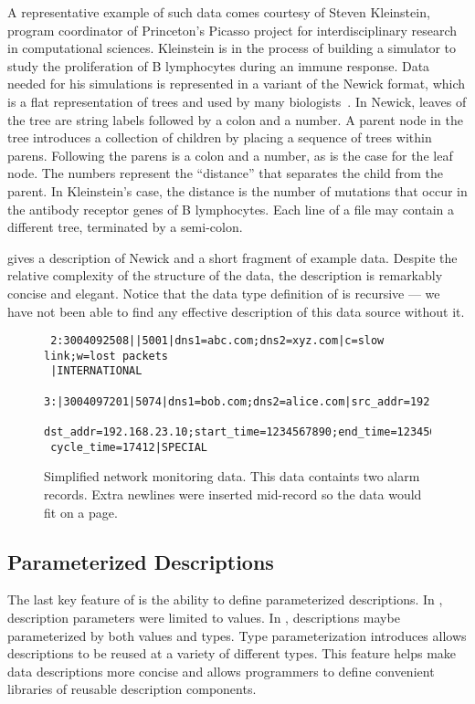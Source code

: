 A representative example of such data comes courtesy of Steven
Kleinstein, program coordinator of Princeton's Picasso project for
interdisciplinary research in computational sciences.  Kleinstein is
in the process of building a simulator to study the
proliferation of B lymphocytes during an immune response.  Data
needed for his simulations is represented in a variant of the
Newick format, which is a flat
representation of trees and used by 
many biologists~\cite{newick}.  In Newick, 
leaves of the tree are string labels followed by a colon and a number.
A parent node in the tree introduces a collection of children by
placing a sequence of trees within parens.  Following the parens is a
colon and a number, as is the case for the leaf node.
The numbers represent the ``distance'' 
that separates the child from the parent.  In
Kleinstein's case, the distance is the number of mutations that occur
in the antibody receptor genes of B lymphocytes.   Each line
of a file may contain a different tree, terminated by a semi-colon.

 gives a description of Newick and a short fragment 
of example data.  Despite the relative complexity of the structure of the data,
the description is remarkably concise and elegant.  Notice that the data type
definition of  is recursive --- we have not been able to find any
effective description of this data source without it.

\begin{figure}
  \centering
  \small
\begin{verbatim}
 2:3004092508||5001|dns1=abc.com;dns2=xyz.com|c=slow link;w=lost packets
 |INTERNATIONAL
 3:|3004097201|5074|dns1=bob.com;dns2=alice.com|src_addr=192.168.0.10;
 dst_addr=192.168.23.10;start_time=1234567890;end_time=1234568000;
 cycle_time=17412|SPECIAL
\end{verbatim}  
  \caption{Simplified network monitoring data.  This 
data containts two alarm records.  Extra newlines 
were inserted mid-record so the data would fit on a page.}
  \label{fig:darkstar-records}
\end{figure}

\subsection{Parameterized Descriptions}

The last key feature of \datatype{} is the ability to define
parameterized descriptions.  In \pads, description parameters
were limited to values.  In \datatype, descriptions
maybe parameterized by both values and types.  Type parameterization
introduces allows descriptions to be
reused at a variety of different types.  This feature 
helps make data descriptions
more concise and allows programmers to define convenient libraries
of reusable description components.


